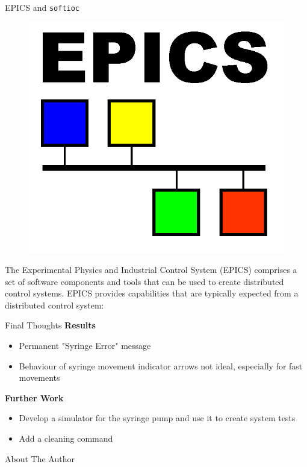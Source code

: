\documentclass[final,t]{beamer}
\begin{document}
\begin{frame}
\begin{columns}[t]
\begin{column}{.32\linewidth}
      \begin{custombox}{EPICS and \texttt{softioc}}
          \begin{figure}
      \includegraphics[width=\linewidth]{images/epicslogo}
          \end{figure}
      The Experimental Physics and Industrial Control System (EPICS) comprises a set of software components and
      tools that can be used to create distributed control systems. EPICS provides capabilities that are typically expected from a distributed control system:
  \end{custombox}

 
  \begin{custombox}{Final Thoughts}
      \textbf{Results} 
    \begin{itemize}
        \item Permanent "Syringe Error" message 
        \item Behaviour of syringe movement indicator arrows not ideal, especially for fast movements 
    \end{itemize}

      \textbf{Further Work }
    \begin{itemize}
        \item Develop a simulator for the syringe pump and use it to create system tests
        \item Add a cleaning command 
    \end{itemize}
  \end{custombox}

  \begin{custombox}{About The Author}
      \lipsum[1-2]
  \end{custombox}
  
  
  \end{column}
  \end{columns}
    
\end{frame}
\end{document}
